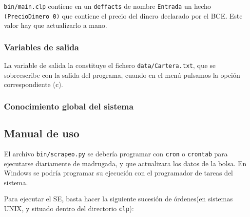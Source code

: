 \documentclass[a4paper,11pt]{article}
\begin{document}
\texttt{bin/main.clp} contiene en un \texttt{deffacts} de nombre \texttt{Entrada} un hecho \texttt{(PrecioDinero 0)}
que contiene el precio del dinero declarado por el BCE. Este valor hay que actualizarlo a mano.

\subsubsection{Variables de salida}
La variable de salida la constituye el fichero \texttt{data/Cartera.txt}, que se sobreescribe con la salida del programa, cuando
en el menú pulsamos la opción correspondiente (c).

\subsubsection{Conocimiento global del sistema}

\subsection{Manual de uso}

El archivo \texttt{bin/scrapeo.py} se debería programar con \texttt{cron} o \texttt{crontab}
para ejecutarse diariamente de madrugada, y que actualizara los datos de la bolsa. En Windows se podría programar su ejecución 
con el programador de tareas del sistema.

Para ejecutar el SE, basta hacer la siguiente sucesión de órdenes(en sistemas UNIX, y situado dentro del directorio \texttt{clp}):
\end{document}
